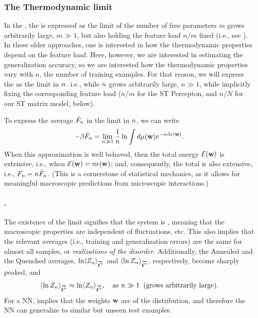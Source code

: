 \subsubsection{The Thermodynamic limit}
\label{sxn:largeN_and_SPA}
In the \SMOG, the \ThermodynamicLimit is expressed as the limit of the number of free parameters $m$ grows arbitrarily large, $m \gg 1$, but also holding the feature load $n/m$ fixed (i.e., see \cite{SST92}).  In these older approaches, one is interested in how the thermodynamic properties depend on the feature load. Here, however, we are interested in estimating the generalization accuracy, so we are interested how the thermodynamic properties vary with $n$, the number of training examples.  For that reason, we will express the \ThermodynamicLimit as the \LargeN limit in $n$. i.e., while $n$ grows arbitrarily large,  $n \gg 1$, while implicitly fixing the corresponding feature load ($n/m$ for the ST Percepton,  and $n/N$ for our ST matrix model, below).

To express the average \FreeEnergy $\bar{F}_{n}$ in the \LargeN limit in $n$, we can write
\begin{align}
  -\beta\bar{F}_{n} = \lim_{n\gg 1}\frac{1}{n}\ln \int d\mu({\mathbf{w}}) e^{-n\beta\epsilon({\mathbf{w}})}  .
\end{align}
When this \LargeN approximation is well behaved,
then the total energy $\mathcal{E}(\mathbf{w})$ is extensive, i.e., when $\mathcal{E}(\mathbf{w})=n\epsilon({\mathbf{w}})$;
and, consequently, the total \FreeEnergy is also extensive, i.e., $F_{n}=n\bar{F}_{n}$.
(This is a cornerstone of statistical mechanics, as it allows for meaningful macroscopic predictions from microscopic interactions.)

\paragraph{\SelfAveraging.}
The existence of the limit signifies that the system is \emph{\SelfAveraging}, meaning that the macroscopic properties are independent of fluctuations, etc.
This also implies that the relevant averages
(i.e., training and generalization errors) are the same for almost all samples, or \emph{realizations of the disorder}.
Additionally, the Annealed and the Quenched averages,
$\ln \langle Z_{\ND} \rangle_{\AVGNDXIn}$ and $\langle \ln Z_{\ND} \rangle_{\AVGNDXIn}$, respectively,
become sharply peaked, and
\begin{align}
\langle \ln Z_{\ND} \rangle_{\AVGNDXIn} \approx \ln \langle Z_{\ND} \rangle_{\AVGNDXIn}, \quad \text{as } \ND \gg 1\;\; \text{(grows arbitrarily large)}.
\end{align}
For a NN, \SelfAveraging implies that the weights ${\mathbf{w}}$ are \emph{\Typical} of the distribution,
and therefore the NN can generalize to similar but unseen test examples.

